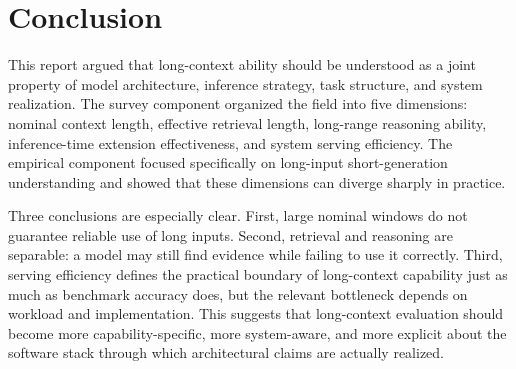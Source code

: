 \documentclass[11pt]{article}
\begin{document}
\section{Conclusion}
\label{sec:conclusion}

This report argued that long-context ability should be understood as a joint property of model architecture, inference strategy, task structure, and system realization. The survey component organized the field into five dimensions: nominal context length, effective retrieval length, long-range reasoning ability, inference-time extension effectiveness, and system serving efficiency. The empirical component focused specifically on long-input short-generation understanding and showed that these dimensions can diverge sharply in practice.

Three conclusions are especially clear. First, large nominal windows do not guarantee reliable use of long inputs. Second, retrieval and reasoning are separable: a model may still find evidence while failing to use it correctly. Third, serving efficiency defines the practical boundary of long-context capability just as much as benchmark accuracy does, but the relevant bottleneck depends on workload and implementation. This suggests that long-context evaluation should become more capability-specific, more system-aware, and more explicit about the software stack through which architectural claims are actually realized.



\end{document}
